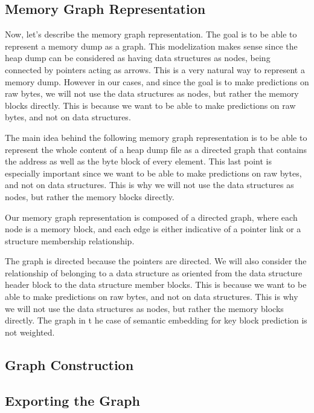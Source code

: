 \subsection{Memory Graph Representation}
Now, let's describe the memory graph representation. The goal is to be able to represent a memory dump as a graph. This modelization makes sense since the heap dump can be considered as having data structures as nodes, being connected by pointers acting as arrows. This is a very natural way to represent a memory dump. However in our cases, and since the goal is to make predictions on raw bytes, we will not use the data structures as nodes, but rather the memory blocks directly. This is because we want to be able to make predictions on raw bytes, and not on data structures. 

The main idea behind the following memory graph representation is to be able to represent the whole content of a heap dump file as a directed graph that contains the address as well as the byte block of every element. This last point is especially important since we want to be able to make predictions on raw bytes, and not on data structures. This is why we will not use the data structures as nodes, but rather the memory blocks directly. 

Our memory graph representation is composed of a directed graph, where each node is a memory block, and each edge is either indicative of a pointer link or a structure membership relationship.

The graph is directed because the pointers are directed. We will also consider the relationship of belonging to a data structure as oriented from the data structure header block to the data structure member blocks. This is because we want to be able to make predictions on raw bytes, and not on data structures. This is why we will not use the data structures as nodes, but rather the memory blocks directly. The graph in t he case of semantic embedding for key block prediction is not weighted. 

\subsection{Graph Construction}

\subsection{Exporting the Graph}


